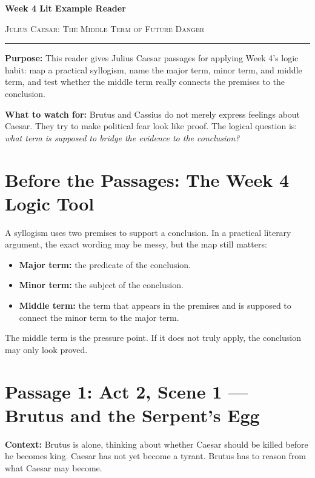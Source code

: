\documentclass[12pt]{article}
\begin{document}
\begin{center}
{\LARGE\bfseries Week 4 Lit Example Reader}\par\vspace{0.05em}
{\large\scshape Julius Caesar: The Middle Term of Future Danger}\par\vspace{0.15em}
\rule{0.78\textwidth}{0.5pt}
\end{center}

\textbf{Purpose:} This reader gives Julius Caesar passages for applying Week 4's logic habit: map a practical syllogism, name the major term, minor term, and middle term, and test whether the middle term really connects the premises to the conclusion.

\textbf{What to watch for:} Brutus and Cassius do not merely express feelings about Caesar. They try to make political fear look like proof. The logical question is: \textit{what term is supposed to bridge the evidence to the conclusion?}

\section*{Before the Passages: The Week 4 Logic Tool}

A syllogism uses two premises to support a conclusion. In a practical literary argument, the exact wording may be messy, but the map still matters:
\begin{itemize}[leftmargin=1.5em,itemsep=0.2em]
\item \textbf{Major term:} the predicate of the conclusion.
\item \textbf{Minor term:} the subject of the conclusion.
\item \textbf{Middle term:} the term that appears in the premises and is supposed to connect the minor term to the major term.
\end{itemize}

The middle term is the pressure point. If it does not truly apply, the conclusion may only look proved.

\section*{Passage 1: Act 2, Scene 1 --- Brutus and the Serpent's Egg}

\textbf{Context:} Brutus is alone, thinking about whether Caesar should be killed before he becomes king. Caesar has not yet become a tyrant. Brutus has to reason from what Caesar may become.
\end{document}
